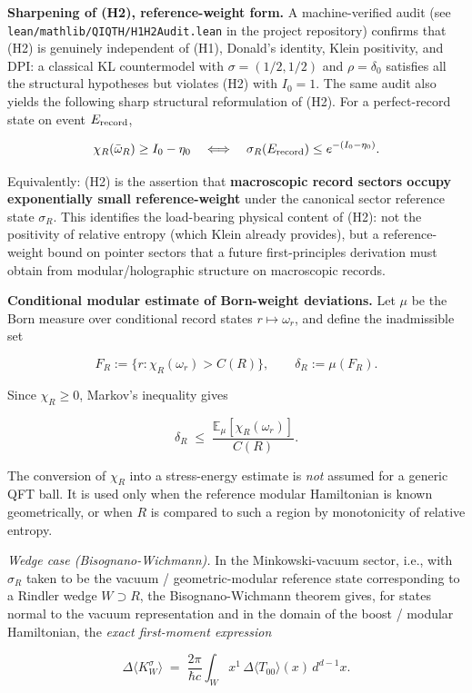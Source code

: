 \documentclass[11pt,a4paper]{article}
\begin{document}
\textbf{Sharpening of (H2), reference-weight form.} A machine-verified audit (see \texttt{lean/mathlib/QIQTH/H1H2Audit.lean} in the project repository) confirms that (H2) is genuinely independent of (H1), Donald's identity, Klein positivity, and DPI: a classical KL countermodel with $\sigma=(1/2,1/2)$ and $\rho=\delta_0$ satisfies all the structural hypotheses but violates (H2) with $I_0=1$. The same audit also yields the following sharp structural reformulation of (H2). For a perfect-record state on event $E_{\rm record}$,

\[
\chi_R(\bar\omega_R) \ge I_0 - \eta_0 \quad \Longleftrightarrow \quad \sigma_R(E_{\rm record}) \le e^{-(I_0 - \eta_0)}.
\]

Equivalently: (H2) is the assertion that \textbf{macroscopic record sectors occupy exponentially small reference-weight} under the canonical sector reference state $\sigma_R$. This identifies the load-bearing physical content of (H2): not the positivity of relative entropy (which Klein already provides), but a reference-weight bound on pointer sectors that a future first-principles derivation must obtain from modular/holographic structure on macroscopic records.

\textbf{Conditional modular estimate of Born-weight deviations.} Let $\mu$ be the Born measure over conditional record states $r \mapsto \omega_r$, and define the inadmissible set

\[
F_R := \{r : \chi_R(\omega_r) > C(R)\}, \qquad \delta_R := \mu(F_R).
\]

Since $\chi_R \ge 0$, Markov's inequality gives

\[
\delta_R \;\le\; \frac{\mathbb{E}_\mu[\chi_R(\omega_r)]}{C(R)}.
\]

The conversion of $\chi_R$ into a stress-energy estimate is \emph{not} assumed for a generic QFT ball. It is used only when the reference modular Hamiltonian is known geometrically, or when $R$ is compared to such a region by monotonicity of relative entropy.

\emph{Wedge case (Bisognano-Wichmann).} In the Minkowski-vacuum sector, i.e., with $\sigma_R$ taken to be the vacuum / geometric-modular reference state corresponding to a Rindler wedge $W \supset R$, the Bisognano-Wichmann theorem gives, for states normal to the vacuum representation and in the domain of the boost / modular Hamiltonian, the \emph{exact first-moment expression}

\[
\Delta\langle K_W^\sigma\rangle \;=\; \frac{2\pi}{\hbar c} \int_W x^1 \, \Delta\langle T_{00}\rangle(x) \, d^{d-1}x.
\]
\end{document}
